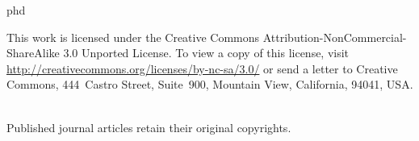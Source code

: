 \documentclass[times,12pt,titlepage]{mstthesis} %
\begin{document}
\begin{ThesisTitlePage}{phd}

\author{\MakeUppercase{Benjamin Henry Payne}}









\end{ThesisTitlePage}


This work is licensed under the Creative Commons Attribution-NonCommercial-ShareAlike 3.0 Unported License. To view a copy of this license, visit 
\\\mbox{\href{http://creativecommons.org/licenses/by-nc-sa/3.0/}{http://creativecommons.org/licenses/by-nc-sa/3.0/}} 
or send a letter to Creative Commons, 444~Castro Street, Suite~900, Mountain View, California, 94041, USA.

\ \\
Published journal articles retain their original copyrights.

% 
% 
% 
% 
% 
% 
% 
% 
% 
% 
\end{document}
